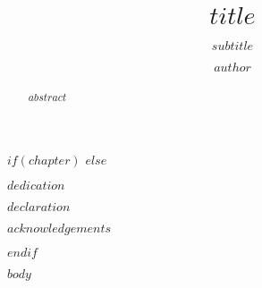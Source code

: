 \documentclass[
$if(chapter)$
  chapter,
$endif$
$if(print)$
  print,
$endif$
$if(lineno)$
  lineno,
$endif$
$if(index)$
  index,
$endif$
$if(papersize)$
  $papersize$,
$endif$
$if(page-layout)$
  $page-layout$,
$endif$
$if(flushleft)$
  flushleft,
$endif$
$if(geometry)$
  custommargin,
$endif$
$if(fontsize)$
  $fontsize$,
$endif$
$if(fontfamily)$
  $fontfamily$,
$endif$
]{PhDThesisPSnPDF}
\title{$title$}
\subtitle{$subtitle$}
\author{$author$}
\begin{document}
\maketitle

\frontmatter

$if(chapter)$
$else$
\begin{dedication}
  $dedication$
\end{dedication}

\begin{declaration}
  $declaration$
\end{declaration}

\begin{acknowledgements}
  $acknowledgements$
\end{acknowledgements}

\begin{abstract}
  $abstract$
\end{abstract}
$endif$

\tableofcontents

\listoffigures

\listoftables

\printnomenclature

\mainmatter

$body$

\printthesisindex
\end{document}
